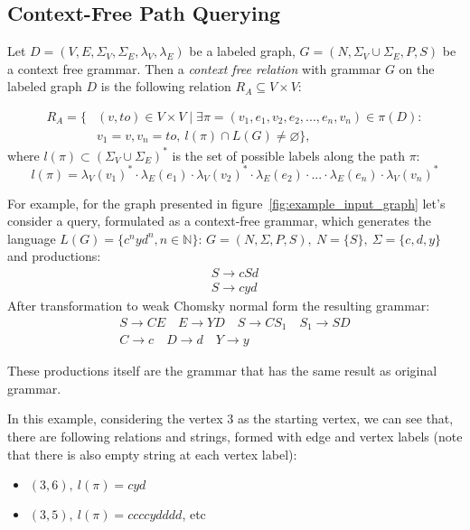 \subsection{Context-Free Path Querying}


\begin{definition}
Let $D = (V, E, \Sigma_V, \Sigma_E, \lambda_V, \lambda_E)$ be a labeled graph, $G = (N, \Sigma_V \cup \Sigma_E, P, S)$ be a context free grammar. Then a \emph{context free relation} with grammar $G$ on the labeled graph $D$ is the following relation $R_A \subseteq V \times V$:

\begin{equation*} \label{eq1}
\begin{split}
R_A = \{&(v, to) \in V \times V \mid \exists \pi = (v_1, e_1, v_2, e_2, ..., e_n, v_n) \in \pi(D): \\
      &v_1 = v, v_n = to,~l(\pi) \cap L(G) \neq \varnothing \},
\end{split}
\end{equation*}
where $l(\pi) \subset (\Sigma_V \cup \Sigma_E)^*$ is the set of possible labels along the path $\pi$:
$$l(\pi) = \lambda_V(v_1)^* \cdot \lambda_E(e_1) \cdot \lambda_V(v_2)^* \cdot \lambda_E(e_2) \cdot ... \cdot \lambda_E(e_n) \cdot \lambda_V(v_n)^*$$

For example, for the graph presented in figure~\ref{fig:example_input_graph} let's consider a query, formulated as a context-free grammar, which generates the language $L(G) = \{c^nyd^n, n \in \mathbb{N}\}$:
$G=(N, \Sigma, P, S), ~N=\{S\},~\Sigma=\{c, d, y\}$ and productions: 
\begin{align*}
S \rightarrow cSd\\
S \rightarrow cyd
\end{align*}
After transformation to weak Chomsky normal form the resulting grammar:
\begin{gather*}
S \rightarrow CE \quad E \rightarrow YD  \quad S \rightarrow CS_1 \quad S_1 \rightarrow SD \\
C \rightarrow c \quad D \rightarrow d \quad Y \rightarrow y
\end{gather*}

These productions itself are the grammar that has the same result as original grammar.

In this example, considering the vertex 3 as the starting vertex, we can see that, there are following relations and strings, formed with edge and vertex labels (note that there is also empty string at each vertex label):
\begin{itemize}
    \item $(3,6),~l(\pi) = cyd$ 
    \item $(3,5),~l(\pi) = ccccydddd$,  etc
\end{itemize}

\end{definition}

